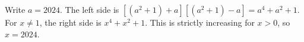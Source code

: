 Write $a=2024$. The left side is $[(a^2+1)+a][(a^2+1)-a]=a^4+a^2+1$. For $x\ne1$, the right side is $x^4+x^2+1$. This is strictly increasing for $x>0$, so $\boxed{x=2024}$.
